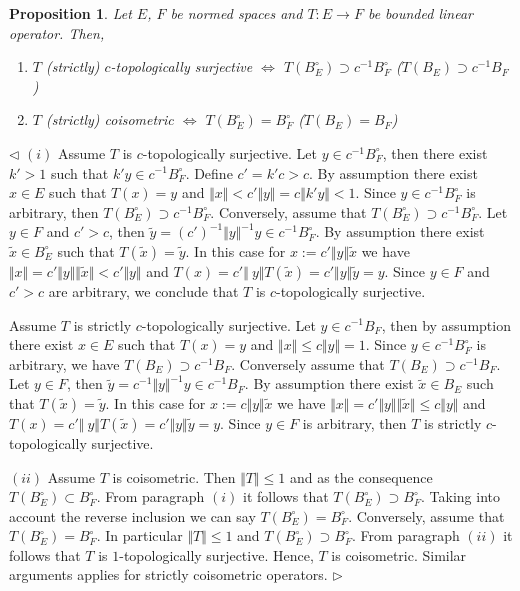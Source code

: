 \documentclass[12pt]{article}
\newtheorem{proposition}[theorem]{Proposition}
\newenvironment{proof}{\par $\triangleleft$}{$\triangleright$}
\begin{document}
\begin{proposition}\label{PrEquivDescOfIsomCoisomOp} Let $E$, $F$ be normed
spaces and $T:E\to F$ be bounded linear operator. Then,
\begin{enumerate}[label = (\roman*)]
    \item $T$ (strictly) $c$-topologically surjective $\Longleftrightarrow$
    $T(B_E^\circ)\supset c^{-1}B_F^\circ$ ($T(B_E)\supset c^{-1}B_F$) 
    \item $T$ (strictly) coisometric 
    $\Longleftrightarrow$ $T(B_E^\circ)=B_F^\circ$ ($T(B_E)=B_F$)
\end{enumerate}
\end{proposition}
\begin{proof}
$(i)$ Assume $T$ is $c$-topologically surjective. Let $y\in c^{-1}B_F^\circ$, 
then there exist $k'>1$ such that $k'y\in c^{-1}B_F^\circ$. Define $c'=k'c>c$. 
By assumption there exist $x\in E$ such that $T(x)=y$ and 
$\Vert x\Vert< c'\Vert y\Vert=c\Vert k'y\Vert<1$. 
Since $y\in c^{-1}B_F^\circ$ is arbitrary, then
$T(B_E^\circ)\supset c^{-1}B_F^\circ$. Conversely, assume that
$T(B_E^\circ)\supset c^{-1}B_F^\circ$. Let $y\in F$ and $c'>c$, then
$\tilde{y}={(c')}^{-1}\Vert y\Vert^{-1}y\in c^{-1}B_F^\circ$. 
By assumption there
exist $\tilde{x}\in B_E^\circ$ such that $T(\tilde{x})=\tilde{y}$. In this case
for $x:=c'\Vert y\Vert\tilde{x}$ we have $\Vert x \Vert=c'\Vert
y\Vert\Vert\tilde{x}\Vert< c'\Vert y\Vert$ and $T(x)=c'\Vert\ y\Vert
T(\tilde{x})=c'\Vert y\Vert\tilde{y}=y$. Since $y\in F$ and $c'>c$ are
arbitrary, we conclude that $T$ is $c$-topologically surjective.

Assume $T$ is strictly $c$-topologically surjective. Let $y\in c^{-1}B_F$, then
by assumption there exist $x\in E$ such that $T(x)=y$ and 
$\Vert x\Vert\leq c\Vert y\Vert=1$. Since $y\in c^{-1}B_F^\circ$ 
is arbitrary, we have $T(B_E)\supset c^{-1}B_F$. 
Conversely assume that $T(B_E)\supset c^{-1}B_F$. Let
$y\in F$, then $\tilde{y}=c^{-1}\Vert y\Vert^{-1}y\in c^{-1}B_F$. By assumption
there exist $\tilde{x}\in B_E$ such that $T(\tilde{x})=\tilde{y}$. In this case
for $x:=c\Vert y\Vert\tilde{x}$ we have $\Vert x \Vert=c'\Vert
y\Vert\Vert\tilde{x}\Vert\leq c\Vert y\Vert$ and $T(x)=c'\Vert\ y\Vert
T(\tilde{x})=c'\Vert y\Vert\tilde{y}=y$. Since $y\in F$ is arbitrary, then $T$
is strictly $c$-topologically surjective.

$(ii)$ Assume $T$ is coisometric. Then $\Vert T\Vert\leq 1$ 
and as the consequence $T(B_E^\circ)\subset B_F^\circ$. From paragraph $(i)$ 
it follows that $T(B_E^\circ)\supset B_F^\circ$. 
Taking into account the reverse inclusion we
can say $T(B_E^\circ)=B_F^\circ$. Conversely, assume that
$T(B_E^\circ)=B_F^\circ$. In particular $\Vert T\Vert\leq 1$ and
$T(B_E^\circ)\supset B_F^\circ$. From paragraph $(ii)$ it follows that $T$ is
$1$-topologically surjective. Hence, $T$ is coisometric. Similar arguments
applies for strictly coisometric operators.
\end{proof}
\end{document}
